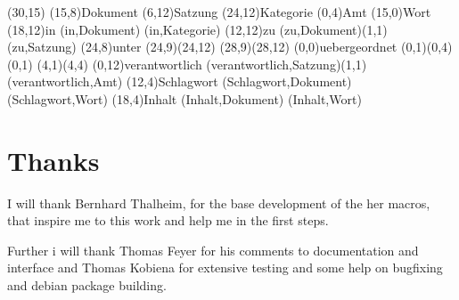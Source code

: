\documentclass[a4paper,11pt]{article}
\begin{document}
\setlength{\hermunit}{.5cm}
\begin{schema}(30,15)
\entity(15,8){Dokument}
%
\entity(6,12){Satzung}
%
\entity(24,12){Kategorie}
%
\entity(0,4){Amt}
%
\entity(15,0){Wort}
%
\relation(18,12){in}
\conn(in,Dokument){}
\conn(in,Kategorie){}
%
\relation(12,12){zu}
\conn(zu,Dokument){(1,1)}
\conn(zu,Satzung){}
%
\relation(24,8){unter}
\conn*(24,9)(24,12){}
\conn*(28,9)(28,12){}
%
\relation(0,0){uebergeordnet}
\conn*(0,1)(0,4){(0,1)}
\conn*(4,1)(4,4){}
%
\relation(0,12){verantwortlich}
\conn(verantwortlich,Satzung){(1,1)}
\conn(verantwortlich,Amt){}
%
\relation(12,4){Schlagwort}
\conn(Schlagwort,Dokument){}
\conn(Schlagwort,Wort){}
%
\relation(18,4){Inhalt}
\conn(Inhalt,Dokument){}
\conn(Inhalt,Wort){}
\end{schema}

\section{Thanks}

I will thank Bernhard Thalheim, for the base development of the her macros, that inspire me 
to this work and help me in the first steps.

Further i will thank Thomas Feyer for his comments to documentation and interface and Thomas
Kobiena for extensive testing and some help on bugfixing and debian package building. 
\end{document}
